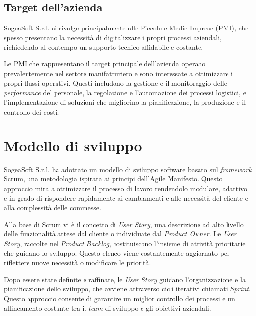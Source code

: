         \subsection{Target dell'azienda}
        SogeaSoft S.r.l. si rivolge principalmente alle Piccole e Medie Imprese (PMI), che spesso presentano la necessità di digitalizzare i propri processi aziendali, richiedendo al contempo un supporto tecnico affidabile e costante.  
        
        \noindent Le PMI che rappresentano il target principale dell’azienda operano prevalentemente nel settore manifatturiero e sono interessate a ottimizzare i propri flussi operativi. Questi includono la gestione e il monitoraggio delle \textit{performance} del personale, la regolazione e l’automazione dei processi logistici, e l’implementazione di soluzioni che migliorino la pianificazione, la produzione e il controllo dei costi.
        
    \section{Modello di sviluppo}
    SogeaSoft S.r.l. ha adottato un modello di sviluppo software basato sul \textit{framework} Scrum, una metodologia ispirata ai principi dell’Agile Manifesto. Questo approccio mira a ottimizzare il processo di lavoro rendendolo modulare, adattivo e in grado di rispondere rapidamente ai cambiamenti e alle necessità del cliente e alla complessità delle commesse.  
    
    \noindent Alla base di Scrum vi è il concetto di \textit{User Story}, una descrizione ad alto livello delle funzionalità attese dal cliente o individuate dal \textit{Product Owner}. Le \textit{User Story}, raccolte nel \textit{Product Backlog}, costituiscono l'insieme di attività prioritarie che guidano lo sviluppo. Questo elenco viene costantemente aggiornato per riflettere nuove necessità o modificare le priorità.
    
    \noindent Dopo essere state definite e raffinate, le \textit{User Story} guidano l'organizzazione e la pianificazione dello sviluppo, che avviene attraverso cicli iterativi chiamati \textit{Sprint}. Questo approccio consente di garantire un miglior controllo dei processi e un allineamento costante tra il \textit{team} di sviluppo e gli obiettivi aziendali. 

